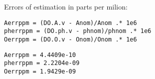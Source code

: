 Errors of estimation in parts per milion:

\begin{lstlisting}
Aerrppm = (DO.A.v - Anom)/Anom .* 1e6
pherrppm = (DO.ph.v - phnom)/phnom .* 1e6
Oerrppm = (DO.O.v - Onom)/Onom .* 1e6
\end{lstlisting}
\begin{lstlisting}[language={},xleftmargin=5pt,frame=none]
Aerrppm = 4.4409e-10
pherrppm = 2.2204e-09
Oerrppm = 1.9429e-09

\end{lstlisting}


\stopcontents[localtoc]
